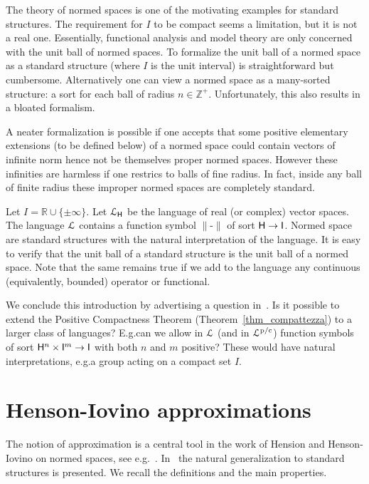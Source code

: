 \documentclass{amsproc}
\begin{document}
The theory of normed spaces is one of the motivating examples for standard structures.
The requirement for $I$ to be compact seems a limitation, but it is not a real one.
Essentially, functional analysis and model theory are only concerned with the unit ball of normed spaces.
To formalize the unit ball of a normed space as a standard structure (where $I$ is the unit interval) is straightforward but cumbersome.
Alternatively one can view a normed space as a many-sorted structure: a sort for each ball of radius $n\in\mathds{Z}^+$.
Unfortunately, this also results in a bloated formalism.

A neater formalization is possible if one accepts that some positive elementary extensions (to be defined below) of a normed space could contain vectors of infinite norm hence not be themselves proper normed spaces.
However these infinities are harmless if one restrics to balls of fine radius.
In fact, inside any ball of finite radius these improper normed spaces are completely standard.

\begin{example}\label{ex_normed_spaces}
Let $I=\mathds{R}\cup\{\pm\infty\}$.
Let ${\EuScript L}_{\sf H}$ be the language of real (or complex) vector spaces.
The language ${\EuScript L}$ contains a function symbol $\|\mbox{-}\|$ of sort ${\sf H}\to {\sf I}$.
Normed space are standard structures with the natural interpretation of the language.
It is easy to verify that the unit ball of a standard structure is the unit ball of a normed space.
Note that the same remains true if we add to the language any continuous (equivalently, bounded) operator or functional.
\end{example}

We conclude this introduction by advertising a question in~\cite{clcl}.
Is it possible to extend the Positive Compactness Theorem (Theorem~\ref{thm_compattezza}) to a larger class of languages?
E.g.\@ can we allow in ${\EuScript L}$ (and in ${\EuScript L}^{\rm p/c}$) function symbols of sort ${\sf H}^n\times {\sf I}^m\to {\sf I}$ with both $n$ and $m$ positive?
These would have natural interpretations, e.g.\@ a group acting on a compact set $I$.

\section{Henson-Iovino approximations}\label{ultrapws} 
The notion of approximation is a central tool in the work of Hension and Henson-Iovino on normed spaces, see e.g.~\cite{HI}.
In~\cite{clcl} the natural generalization to standard structures is presented.
We recall the definitions and the main properties.
\end{document}
